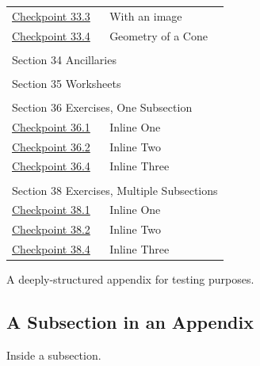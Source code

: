 \documentclass{amsart}
\theoremstyle{plain}%
\theoremstyle{definition}%
\theoremstyle{remark}%
\numberwithin{equation}{section}
\begin{document}
\begin{longtable}[l]{ll}
\hyperref[section-myopenmath-5]{Checkpoint 33.3}& With an image\\
\hyperref[section-myopenmath-6]{Checkpoint 33.4}& Geometry of a Cone\\
\multicolumn{2}{l}{\null}\\[1.5ex] \multicolumn{2}{l}{\large Section 34 Ancillaries}\\[0.5ex]
\multicolumn{2}{l}{\null}\\[1.5ex] \multicolumn{2}{l}{\large Section 35 Worksheets}\\[0.5ex]
\multicolumn{2}{l}{\null}\\[1.5ex] \multicolumn{2}{l}{\large Section 36 Exercises, One Subsection}\\[0.5ex]
\hyperref[section-exercises-single-5]{Checkpoint 36.1}& Inline One\\
\hyperref[duplicate-inline]{Checkpoint 36.2}& Inline Two\\
\hyperref[section-exercises-single-9]{Checkpoint 36.4}& Inline Three\\
\multicolumn{2}{l}{\null}\\[1.5ex] \multicolumn{2}{l}{\large Section 38 Exercises, Multiple Subsections}\\[0.5ex]
\hyperref[section-exercises-multiple-3-2]{Checkpoint 38.1}& Inline One\\
\hyperref[section-exercises-multiple-3-4]{Checkpoint 38.2}& Inline Two\\
\hyperref[exercise-duplicate-inline]{Checkpoint 38.4}& Inline Three\\
\end{longtable}
%
%
\typeout{************************************************}
\typeout{************************************************}
%
\label{appendix-structured}%
A deeply-structured appendix for testing purposes.%
%
%
\typeout{************************************************}
\typeout{************************************************}
%
\subsection{A Subsection in an Appendix}\label{appendix-structured-3}%
Inside a subsection.%
%
%
\typeout{************************************************}
\typeout{************************************************}
%
\end{document}
